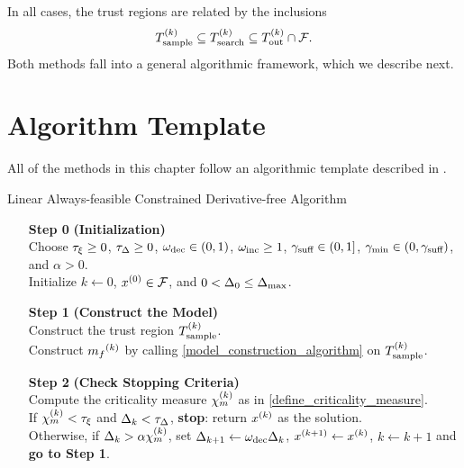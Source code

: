 In all cases, the trust regions are related by the inclusions
\begin{align*}
{T_{\text{sample}}^{(k)}} \subseteq {T_{\text{search}}^{(k)}} \subseteq {T_{\text{out}}^{(k)}} \cap {\mathcal F}.
\end{align*}
Both methods fall into a general algorithmic framework, which we describe next.


\section{Algorithm Template}\label{sec:template}

All of the methods in this chapter follow
an algorithmic template described in \cite{Conejo:2013:GCT:2620806.2621814}.


{
\begin{fullwidth}[leftmargin=0in, rightmargin=0in, width=\linewidth-0.35in]
\begin{flushleft}

\begin{algorithm}[H]
    \caption{Linear Always-feasible Constrained Derivative-free Algorithm}
    \label{linearly_constrained_dfo_simple}
    \begin{itemize}
        \item[\textbf{Step 0}] \textbf{(Initialization)} \\
            Choose
            $\tau_{\xi}\ge 0$,
            $\tau_{\Delta} \ge 0$, 
            $\omega_{\text{dec}} \in (0,1)$, 
            $\omega_{\text{inc}} \ge 1$,  
            $ \gamma_{\textrm{suff}} \in (0,1]$, 
            $\gamma_{\textrm{min}} \in (0,\gamma_{\textrm{suff}})$,
			and $\alpha > 0$. \\
            Initialize
            $k\gets 0$,
            $x^{(0)} \in {\mathcal F}$,
            and $0 < \Delta_0 \le {\Delta_{\textrm{max}}}$.
            
        \item[\textbf{Step 1}] \textbf{(Construct the Model)} \\
           Construct the trust region ${T_{\text{sample}}^{(k)}}$. \\
           Construct ${{m}_f}^{(k)}$ by calling \cref{model_construction_algorithm} on ${T_{\text{sample}}^{(k)}}$.
        
        \item[\textbf{Step 2}] \textbf{(Check Stopping Criteria)} \\
            Compute the criticality measure ${\chi_m^{(k)}}$ as in \cref{define_criticality_measure}. \\
            If $ {\chi_m^{(k)}} < \tau_{\xi} $ and $\Delta_k <\tau_{\Delta}$,  {\bf stop}: return $x^{(k)}$ as the solution.   \\
            Otherwise, if $\Delta_k > \alpha {\chi_m^{(k)}}$,   
            set 
                $\Delta_{k+1} \gets \omega_{\text{dec}}\Delta_k$, 
                ${{x}^{(k+1)}} \gets x^{(k)}$,
                $k \gets k+1$ and {\bf go to Step 1}.
           

\end{itemize}
\end{algorithm}
\end{flushleft}
\end{fullwidth}}
